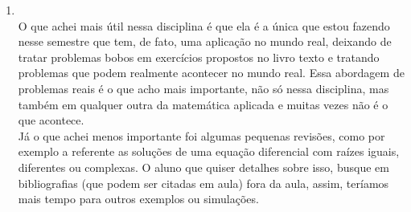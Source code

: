 \documentclass[a4paper]{article}
\begin{document}
\begin{enumerate}
\begin{equation}
\begin{array}{l}
\\
\Delta C_n = \gamma P_n H_n - \varepsilon H_n  \\
\end{array}
\end{equation}
\\
Onde:
\\
$P_n$ \'e a popula\c{c}\~ao de peixes;\\
$H_n$ \'e a popula\c{c}\~ao de pescadores;\\
$K$ \'e a capacidade de suporte do meio, no nosso caso, do lago;\\
$\alpha$ \'e a taxa de crescimento da popula\c{c}\~ao de peixes; \\
$\beta$ \'e a taxa de decrescimento da popula\c{c}\~ao de peixes; \\
$\gamma$ \'e a taxa de decrescimento da popula\c{c}\~ao de pescadores; \\
$\varepsilon$ \'e a taxa com que os pescadores s\~ao desencorajados a pescar. 
\\
\\
O termo $\alpha P_n (1 - \frac{ P_n}{K})$ representa o crecimento log\'istico da popula\c{c}\~ao de peixes, caso n\~ao exista pescadores. O efeito produzido pelo aparecimento dos pescadores \'e proporcional ao produto das popula\c{c}\~oes (peixe e pescadores) multiplicado por um fator de descrecimento da popula\c{c}\~ao de peixes.
\\
A taxa com que os pescadores s\~ao atra\'idos para o lago \'e representado pelo produto das popula\c{c}\~oes (peixe e pescadores) multiplicado por um fator de crescimento dos pescadores. J\' a a diminui\c{c}\~ao dos pescadores \'e proporcional a taxa de pescadores j\'a existentes multiplicado por um fator de desencorajamento.
\\
\item
\\
O que achei mais \'util nessa disciplina \'e que ela \'e a \'unica que estou fazendo nesse semestre que tem, de fato, uma aplica\c{c}\~ao no mundo real, deixando de tratar problemas bobos em exerc\'icios propostos no livro texto e tratando problemas que podem realmente acontecer no mundo real. Essa abordagem de problemas reais \'e o que acho mais importante, n\~ao s\'o nessa disciplina, mas tamb\'em em qualquer outra da matem\'atica aplicada e muitas vezes n\~ao \'e o que acontece.
\\
J\'a o que achei menos importante foi algumas pequenas revis\~oes, como por exemplo a referente as solu\c{c}\~oes de uma equa\c{c}\~ao diferencial com ra\'izes iguais, diferentes ou complexas. O aluno que quiser detalhes sobre isso, busque em bibliografias (que podem ser citadas em aula) fora da aula, assim, ter\'iamos mais tempo para outros exemplos ou simula\c{c}\~oes.

\end{enumerate}
\end{document}
